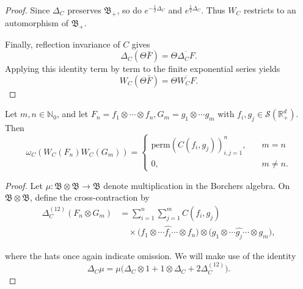\documentclass[10pt,a4paper,oneside,reqno]{amsart}
\newcommand{\reals}{\mathbb{R}}
\begin{document}
\begin{appendices}
\begin{proof}
Since $\Delta_C$ preserves $\mathfrak B_+$, so do
$e^{-\frac12\Delta_C}$ and $e^{\frac12\Delta_C}$. Thus $W_C$ restricts
to an automorphism of $\mathfrak B_+$.

Finally, reflection invariance of $C$ gives
\begin{equation}
  \Delta_C(\Theta\bar F)
  =
  \Theta\overline{\Delta_CF}.
\end{equation}
Applying this identity term by term to the finite exponential series
yields
\begin{equation}
  W_C(\Theta\bar F)
  =
  \Theta\overline{W_CF}.
\end{equation}
\end{proof}

\begin{lemma}\label{lem:Permanent_after_Wick}
    Let $m,n \in \mathbb{N}_0$, and let $F_n = f_1\otimes \cdots \otimes f_n, G_m = g_1\otimes \cdots g_m$ with $f_i, g_j \in \mathcal{S}(\reals^d_+)$. Then
    \begin{equation}
        \omega_C\left(W_C(F_n) W_C(G_m)\right) =\begin{cases}
        \mathrm{perm}\left(C(f_i,g_j)\right)_{i,j=1}^n, \quad &m=n\\
        0, &m\neq n.
        \end{cases}
    \end{equation}
\end{lemma}
\begin{proof}
Let $\mu\colon\mathfrak B\otimes\mathfrak B\longrightarrow\mathfrak B$
denote multiplication in the Borchers algebra. On
$\mathfrak B\otimes\mathfrak B$, define the cross-contraction by
\begin{align}
  \Delta_C^{(12)}(F_n\otimes G_m)
  &=
  \sum_{i=1}^n\sum_{j=1}^m C(f_i,g_j)\\
  &\quad\times
  \bigl(
    f_1\otimes\cdots\widehat{f_i}\cdots\otimes f_n
  \bigr)
  \otimes
  \bigl(
    g_1\otimes\cdots\widehat{g_j}\cdots\otimes g_m
  \bigr), 
\end{align}

where the hats once again indicate omission. We will make use of the identity
\begin{equation}
    \Delta_C\mu
    =\mu\bigl(
    \Delta_C\otimes 1
    +1\otimes\Delta_C
    +2\Delta_C^{(12)}
  \bigr). 
\end{equation}


\end{proof}
\end{appendices}
\end{document}
